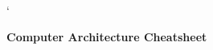 `\documentclass[answers,12pt,addpoints]{exam}
\begin{document}
        
    
            

            
            
            
        
        


\begin{center}
    \Large \textbf{Computer Architecture Cheatsheet}
\end{center}
\end{document}
